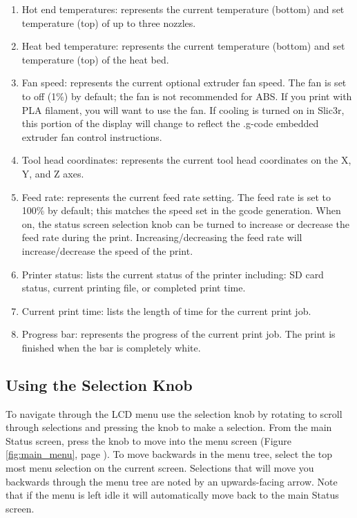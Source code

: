 \begin{enumerate}
\item Hot end temperatures: represents the current temperature (bottom) and set temperature (top) of up to three nozzles.
\item Heat bed temperature: represents the current temperature (bottom) and set temperature (top) of the heat bed.
\item Fan speed: represents the current optional extruder fan speed. The fan is set to off (1\%) by default; the fan is not recommended for ABS. If you print with PLA filament, you will want to use the fan. If cooling is turned on in Slic3r, this portion of the display will change to reflect the .g-code embedded extruder fan control instructions.
\item Tool head coordinates: represents the current tool head coordinates on the X, Y, and Z axes.
\item Feed rate: represents the current feed rate setting. The feed rate is set to 100\% by default; this matches the speed set in the gcode generation. When on, the status screen selection knob can be turned to increase or decrease the feed rate during the print. Increasing/decreasing the feed rate will increase/decrease the speed of the print.
\item Printer status: lists the current status of the printer including: SD card status, current printing file, or completed print time.
\item Current print time: lists the length of time for the current print job.
\item Progress bar: represents the progress of the current print job. The print is finished when the bar is completely white.
\end{enumerate}


\subsection{Using the Selection Knob}
To navigate through the LCD menu use the selection knob by rotating to scroll through selections and pressing the knob to make a selection. From the main Status screen, press the knob to move into the menu screen (Figure \ref{fig:main_menu}, page \pageref{fig:main_menu}). To move backwards in the menu tree, select the top most menu selection on the current screen. Selections that will move you backwards through the menu tree are noted by an upwards-facing arrow. Note that if the menu is left idle it will automatically move back to the main Status screen.

